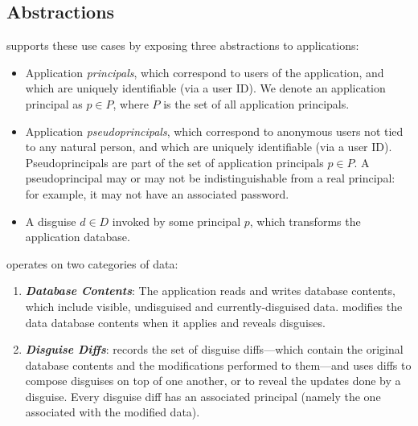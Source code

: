 \subsection{\sys Abstractions}
\sys supports these use cases by exposing three abstractions to applications:
\begin{itemize}
    \item Application \emph{principals}, which correspond to users of the application, 
	and which are uniquely identifiable (\eg via a user ID).
	We denote an application principal as $p \in P$, where $P$ is the set of all application principals.
    \item Application \emph{pseudoprincipals}, which correspond to anonymous users not tied to any natural
    person, and which are uniquely identifiable (\eg via a user ID).
	Pseudoprincipals are part of the set of application principals $p \in P$.
    A pseudoprincipal may or may not be indistinguishable from a real principal: for example, it 
        may not have an associated password.
    \item A disguise $d \in D$ invoked by some principal $p$, which 
        transforms the application database.
\end{itemize}
%
%
\sys operates on two categories of data:
\begin{enumerate}
    \item \emph{\textbf{Database Contents}}: The application reads and writes database
        contents, which include visible, undisguised and currently-disguised data.
        \sys modifies the data database contents when it applies and reveals disguises.
    \item \emph{\textbf{Disguise Diffs}}: \sys records the set of disguise diffs---which contain the
        original database contents and the modifications performed to them---and uses diffs to
        compose disguises on top of one another, or to reveal the updates done by a disguise.
        Every disguise diff has an associated principal (namely the one associated with the modified data).
\end{enumerate}

